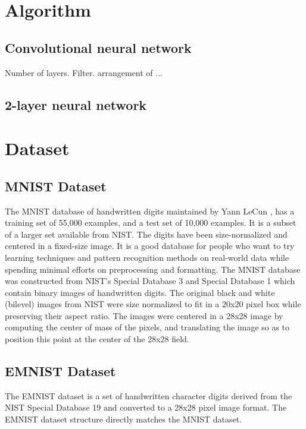 \section{Algorithm}
\subsection{Convolutional neural network}
Number of layers. Filter. arrangement of ...
\subsection{2-layer neural network}

\section{Dataset}
\subsection{MNIST Dataset}
The MNIST database of handwritten digits maintained by Yann LeCun \cite{MNIST}, has a training set of 55,000 examples, and a test set of 10,000 examples. It is a subset of a larger set available from NIST. The digits have been size-normalized and centered in a fixed-size image. It is a good database for people who want to try learning techniques and pattern recognition methods on real-world data while spending minimal efforts on preprocessing and formatting. The MNIST database was constructed from NIST's Special Database 3 and Special Database 1 which contain binary images of handwritten digits. The original black and white (bilevel) images from NIST were size normalized to fit in a 20x20 pixel box while preserving their aspect ratio. The images were centered in a 28x28 image by computing the center of mass of the pixels, and translating the image so as to position this point at the center of the 28x28 field.

\subsection{EMNIST Dataset}
The EMNIST dataset is a set of handwritten character digits derived from the NIST Special Database 19
and converted to a 28x28 pixel image format. The EMNIST dataset structure directly matches the MNIST dataset.

